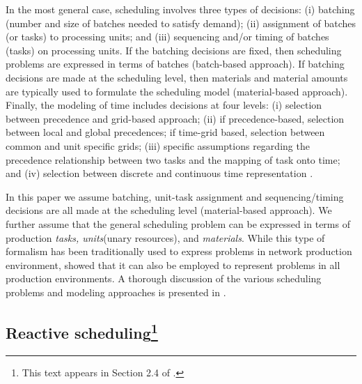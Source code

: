 In the most general case, scheduling involves three types of
decisions: (i) batching (number and size of batches needed to satisfy
demand); (ii) assignment of batches (or tasks) to processing units;
and (iii) sequencing and/or timing of batches (tasks) on processing
units. If the batching decisions are fixed, then scheduling problems
are expressed in terms of batches (batch-based approach). If batching
decisions are made at the scheduling level, then materials and
material amounts are typically used to formulate the scheduling model
(material-based approach). Finally, the modeling of time includes
decisions at four levels: (i) selection between precedence and
grid-based approach; (ii) if precedence-based, selection between local
and global precedences; if time-grid based, selection between common
and unit specific grids; (iii) specific assumptions regarding the
precedence relationship between two tasks and the mapping of task onto
time; and (iv) selection between discrete and continuous time
representation \citep{maravelias:2012}.

In this paper we assume batching, unit-task assignment and
sequencing/timing decisions are all made at the scheduling level
(material-based approach). We further assume that the general
scheduling problem can be expressed in terms of production
{\em{tasks, units}}(unary resources), and
{\em{materials}}. While this type of formalism has been traditionally
used to express problems in network production environment,
\citet{sundaramoorthy:maravelias:2010} showed that it can also be
employed to represent problems in all production environments. A thorough discussion of the
various scheduling problems and modeling approaches is presented in
\citet{mendez:cerda:grossmann:harjunkoski:fahl:2006}.


\subsection{Reactive scheduling\footnote{This text appears in Section 2.4 of
\citet{subramanian:maravelias:rawlings:2012}.} }
\label{sec:scheduling:lit_review:rescheduling}


